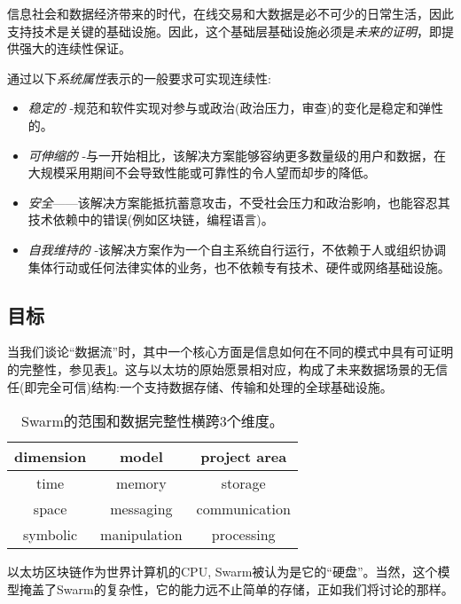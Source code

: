 信息社会和数据经济带来的时代，在线交易和大数据是必不可少的日常生活，因此支持技术是关键的基础设施。因此，这个基础层基础设施必须是\emph{未来的证明}，即提供强大的连续性保证。

通过以下\emph{系统属性}表示的一般要求可实现连续性:

\begin{itemize}
\item \emph{稳定的} -规范和软件实现对参与或政治(政治压力，审查)的变化是稳定和弹性的。
\item \emph{可伸缩的} -与一开始相比，该解决方案能够容纳更多数量级的用户和数据，在大规模采用期间不会导致性能或可靠性的令人望而却步的降低。  
\item \emph{安全}——该解决方案能抵抗蓄意攻击，不受社会压力和政治影响，也能容忍其技术依赖中的错误(例如区块链，编程语言)。 
\item \emph{自我维持的} -该解决方案作为一个自主系统自行运行，不依赖于人或组织协调集体行动或任何法律实体的业务，也不依赖专有技术、硬件或网络基础设施。 
\end{itemize}




\subsection{目标\statusyellow}\label{sec:objectives}


当我们谈论“数据流”时，其中一个核心方面是信息如何在不同的模式中具有可证明的完整性，参见表\ref{tab:scope}。这与以太坊的原始愿景相对应，构成了未来数据场景的无信任(即完全可信)结构:一个支持数据存储、传输和处理的全球基础设施。

\begin{table}[htb]
\centering
\begin{tabular}{c|c|c}
dimension & model & project area\\\hline
%
time & memory & storage \\
space & messaging & communication \\
symbolic & manipulation & processing \\
\end{tabular}
\caption{Swarm的范围和数据完整性横跨3个维度。}
\label{tab:scope}
\end{table}

 
以太坊区块链作为世界计算机的CPU, Swarm被认为是它的“硬盘”。当然，这个模型掩盖了Swarm的复杂性，它的能力远不止简单的存储，正如我们将讨论的那样。


